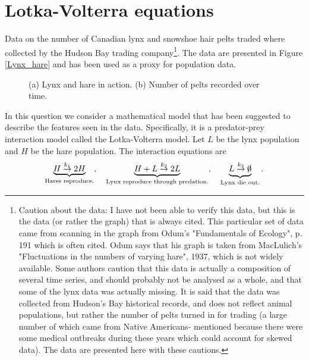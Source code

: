 \documentclass[]{article}
\newcommand{\bb}{\begin{equation}}
\newcommand{\ee}{\end{equation}}
\newcommand{\fig}[1]{Figure \ref{#1}}
\newcommand{\tttp}{.32\textwidth}
\begin{document}
\section{Lotka-Volterra equations}\label{Lotka-Volterra equations}
Data on the number of Canadian lynx and snowshoe hair pelts traded where collected by the  Hudson Bay trading company\footnote{Caution about the data: I have not been able to verify this data, but this is the data (or rather the graph) that is always cited. This particular set of data came from scanning in the graph from Odum's "Fundamentals of Ecology", p. 191 which is often cited. Odum says that his graph is taken from MacLulich's "Fluctuations in the numbers of varying hare", 1937, which is not widely available. Some authors caution that this data is actually a composition of several time series, and should probably not be analysed as a whole, and that some of the lynx data was actually missing. It is said that the data was collected from Hudson's Bay historical records, and does not reflect animal populations, but rather the number of pelts turned in for trading (a large number of which came from Native Americans- mentioned because there were some medical outbreaks during these years which could account for skewed data). The data are presented here with these cautions. }. The data are presented in \fig{Lynx_hare} and has been used as a proxy for population data.
\begin{figure}[h!!!tb]
\centering
{}
\caption{ (a) Lynx and hare in action. (b) Number of pelts recorded over time.}
\end{figure}
In this question we consider a mathematical model that has been suggested to describe the features seen in the data. Specifically, it is a predator-prey interaction model called the Lotka-Volterra model. Let $L$ be the lynx population and $H$ be the hare population. The interaction equations are 
\bb
\underbrace{H\stackrel{k_1}{\rightarrow}2H}_{\textrm{Hares reproduce.}}, \quad \underbrace{H+L\stackrel{k_2}{\rightarrow}2L}_{\textrm{Lynx reproduce through predation.}}, \quad \underbrace{L\stackrel{k_3}{\rightarrow}\slashed{0}}_{\textrm{Lynx die out.}}.
\ee
\end{document}
